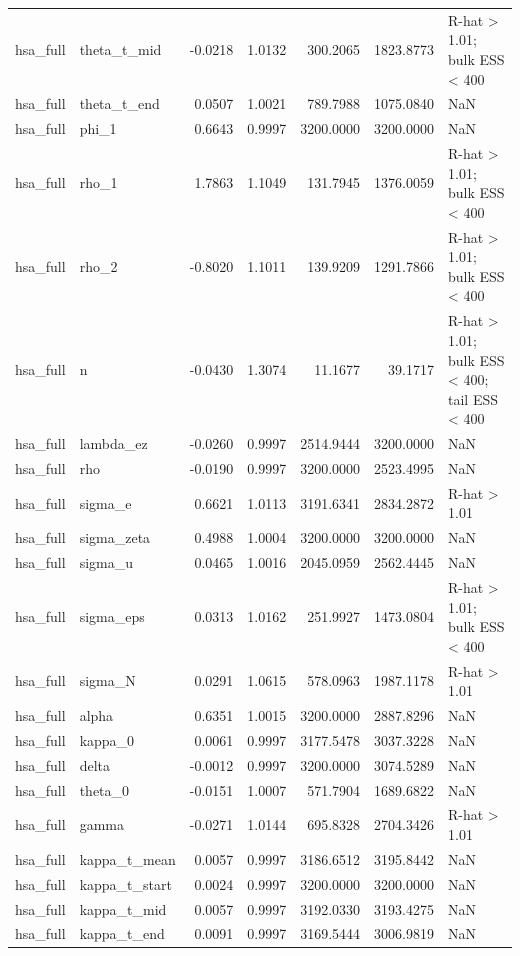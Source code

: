 \begin{tabular}{llrrrrl}
hsa\_full & theta\_t\_mid & -0.0218 & 1.0132 & 300.2065 & 1823.8773 & R-hat > 1.01; bulk ESS < 400 \\
hsa\_full & theta\_t\_end & 0.0507 & 1.0021 & 789.7988 & 1075.0840 & NaN \\
hsa\_full & phi\_1 & 0.6643 & 0.9997 & 3200.0000 & 3200.0000 & NaN \\
hsa\_full & rho\_1 & 1.7863 & 1.1049 & 131.7945 & 1376.0059 & R-hat > 1.01; bulk ESS < 400 \\
hsa\_full & rho\_2 & -0.8020 & 1.1011 & 139.9209 & 1291.7866 & R-hat > 1.01; bulk ESS < 400 \\
hsa\_full & n & -0.0430 & 1.3074 & 11.1677 & 39.1717 & R-hat > 1.01; bulk ESS < 400; tail ESS < 400 \\
hsa\_full & lambda\_ez & -0.0260 & 0.9997 & 2514.9444 & 3200.0000 & NaN \\
hsa\_full & rho & -0.0190 & 0.9997 & 3200.0000 & 2523.4995 & NaN \\
hsa\_full & sigma\_e & 0.6621 & 1.0113 & 3191.6341 & 2834.2872 & R-hat > 1.01 \\
hsa\_full & sigma\_zeta & 0.4988 & 1.0004 & 3200.0000 & 3200.0000 & NaN \\
hsa\_full & sigma\_u & 0.0465 & 1.0016 & 2045.0959 & 2562.4445 & NaN \\
hsa\_full & sigma\_eps & 0.0313 & 1.0162 & 251.9927 & 1473.0804 & R-hat > 1.01; bulk ESS < 400 \\
hsa\_full & sigma\_N & 0.0291 & 1.0615 & 578.0963 & 1987.1178 & R-hat > 1.01 \\
hsa\_full & alpha & 0.6351 & 1.0015 & 3200.0000 & 2887.8296 & NaN \\
hsa\_full & kappa\_0 & 0.0061 & 0.9997 & 3177.5478 & 3037.3228 & NaN \\
hsa\_full & delta & -0.0012 & 0.9997 & 3200.0000 & 3074.5289 & NaN \\
hsa\_full & theta\_0 & -0.0151 & 1.0007 & 571.7904 & 1689.6822 & NaN \\
hsa\_full & gamma & -0.0271 & 1.0144 & 695.8328 & 2704.3426 & R-hat > 1.01 \\
hsa\_full & kappa\_t\_mean & 0.0057 & 0.9997 & 3186.6512 & 3195.8442 & NaN \\
hsa\_full & kappa\_t\_start & 0.0024 & 0.9997 & 3200.0000 & 3200.0000 & NaN \\
hsa\_full & kappa\_t\_mid & 0.0057 & 0.9997 & 3192.0330 & 3193.4275 & NaN \\
hsa\_full & kappa\_t\_end & 0.0091 & 0.9997 & 3169.5444 & 3006.9819 & NaN \\

\end{tabular}
